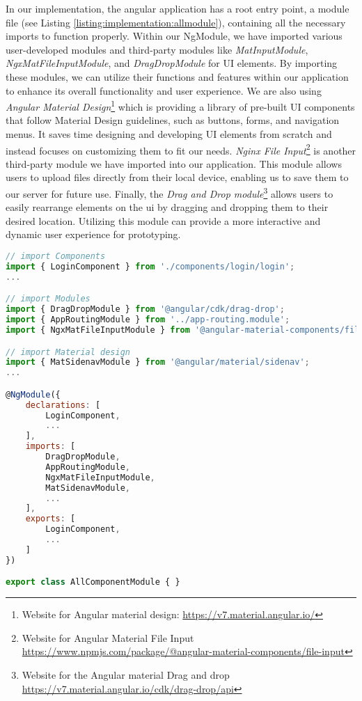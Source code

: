 In our implementation, the angular application has a root entry point, a module file (see Listing \ref{listing:implementation:allmodule}), containing all the necessary imports to function properly. 
Within our NgModule, we have imported various user-developed modules and third-party modules like \textit{MatInputModule}, \textit{NgxMatFileInputModule}, and \textit{DragDropModule} for UI elements. 
By importing these modules, we can utilize their functions and features within our application to enhance its overall functionality and user experience.
We are also using \textit{Angular Material Design}\footnote{Website for Angular material design: \url{https://v7.material.angular.io/}} which is providing a library of pre-built UI components that follow Material Design guidelines, such as buttons, forms, and navigation menus. 
It saves time designing and developing UI elements from scratch and instead focuses on customizing them to fit our needs.
\textit{Nginx File Input}\footnote{Website for Angular Material File Input \url{https://www.npmjs.com/package/@angular-material-components/file-input}} is another third-party module we have imported into our application. 
This module allows users to upload files directly from their local device, enabling us to save them to our server for future use.
Finally, the \textit{Drag and Drop module}\footnote{Website for the Angular material Drag and drop \url{https://v7.material.angular.io/cdk/drag-drop/api}} allows users to easily rearrange elements on the \ac{ui} by dragging and dropping them to their desired location. 
Utilizing this module can provide a more interactive and dynamic user experience for prototyping.

\begin{lstlisting}[language=JavaScript, caption=The File Defining All the Modules, label=listing:implementation:allmodule]
// import Components
import { LoginComponent } from './components/login/login';
...

// import Modules
import { DragDropModule } from '@angular/cdk/drag-drop';
import { AppRoutingModule } from '../app-routing.module';
import { NgxMatFileInputModule } from '@angular-material-components/file-input';

// import Material design
import { MatSidenavModule } from '@angular/material/sidenav';
...

@NgModule({
    declarations: [
        LoginComponent,
        ...
    ],
    imports: [
        DragDropModule,
        AppRoutingModule,
        NgxMatFileInputModule,
        MatSidenavModule,
        ...
    ],
    exports: [
        LoginComponent, 
        ...
    ]
})

export class AllComponentModule { }
\end{lstlisting}

